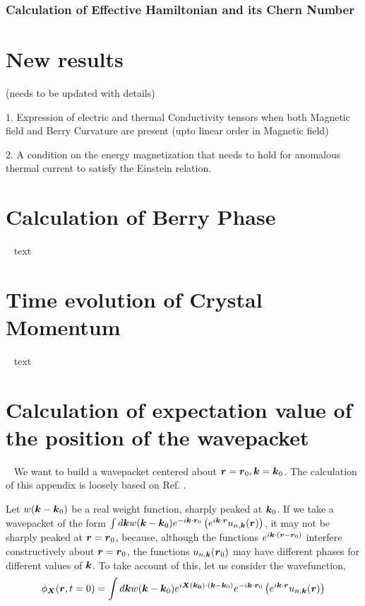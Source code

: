 \documentclass{report}
\renewcommand\vec[1]{\ensuremath\boldsymbol{#1}} %
\begin{document}
\subsection{Calculation of Effective Hamiltonian and its Chern Number}

\chapter{New results}
(needs to be updated with details)

1. Expression of electric and thermal Conductivity tensors when both Magnetic field and Berry Curvature are present (upto linear order in Magnetic field)

2. A condition on the energy magnetization that needs to hold for anomalous thermal current to satisfy the Einstein relation.
\appendix
\chapter{Calculation of Berry Phase}~\label{app:BerryPhase}
text
\chapter{Time evolution of Crystal Momentum}~\label{app:crystal-momentum-time-evolution}
text
\chapter{Calculation of expectation value of the position of the wavepacket}~\label{app:center-at-zero-time}
We want to build a wavepacket centered about $\vec{r}= \vec{r}_0, \vec{k}= \vec{k}_0$. The calculation of this appendix is loosely based on Ref. \cite{ralph2020berry}.


Let  $w(\vec{k} - \vec{k}_0)$ be a real weight function, sharply peaked at $\vec{k}_0$. If we take a wavepacket of the form $\int d\vec{k} w(\vec{k} - \vec{k}_0) e^{-i \vec{k} \cdot \vec{r}_0 } \left(e^{i \vec{k} \cdot\vec{r}} u_{n,\vec{k}}(\vec{r})\right)$, it may not be sharply peaked at $\vec{r} = \vec{r}_0$, because, although the functions $e^{i \vec{k} \cdot(\vec{r} - \vec{r}_0)}$ interfere constructively about $\vec{r} = \vec{r}_0$, the functions $u_{n,\vec{k}}(\vec{r}_0)$ may have different phases for different values of $\vec{k}$. To take account of this, let us consider the wavefunction, 
\begin{equation}\label{Eq:wavefunction-X}
	\phi_{\vec{X}}(\vec{r}, t=0) = \int d\vec{k} w(\vec{k} - \vec{k}_0) e^{i \vec{X}(\vec{k_0})\cdot (\vec{k} - \vec{k}_0)} e^{-i \vec{k} \cdot \vec{r}_0 } \left(e^{i \vec{k} \cdot\vec{r}} u_{n,\vec{k}}(\vec{r})\right)
\end{equation}
\end{document}
